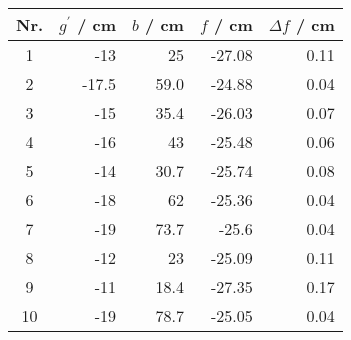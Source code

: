 \begin{tabular}{c|rrrr}
Nr. & $g^\prime$ / cm & $b$ / cm & $f$ / cm & $\Delta f$ / cm \\
\hline
1 & -13 & 25 & -27.08 & 0.11\\
2 & -17.5 & 59.0 & -24.88 & 0.04\\
3 & -15 & 35.4 & -26.03 & 0.07\\
4 & -16 & 43 & -25.48 & 0.06\\
5 & -14 & 30.7 & -25.74 & 0.08\\
6 & -18 & 62 & -25.36 & 0.04\\
7 & -19 & 73.7 & -25.6 & 0.04\\
8 & -12 & 23 & -25.09 & 0.11\\
9 & -11 & 18.4 & -27.35 & 0.17\\
10 & -19 & 78.7 & -25.05 & 0.04
\end{tabular}
